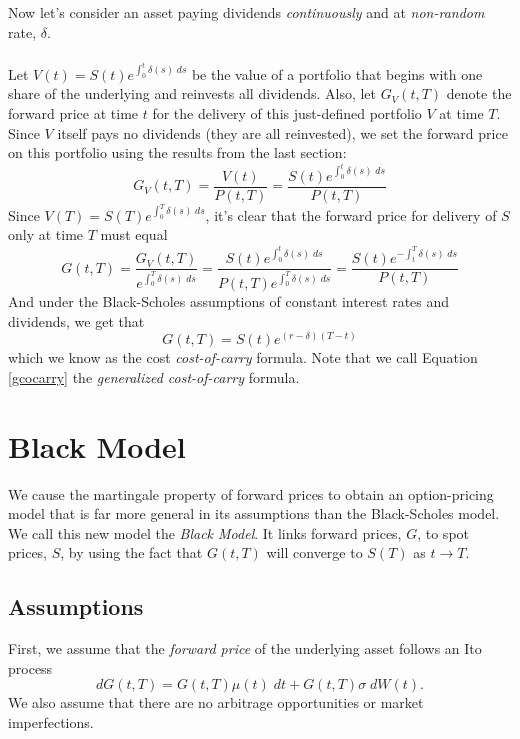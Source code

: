 \documentclass[12pt]{article}
\theoremstyle{plain}
\theoremstyle{definition}
\theoremstyle{remark}
\begin{document}
Now let's consider an asset paying dividends \emph{continuously}
and at \emph{non-random} rate, $\delta$.
\\
\\
Let $V(t) = S(t) e^{\int^t_0 \delta(s) \; ds}$ be the value of a
portfolio that begins with one share of the underlying and
reinvests all dividends.  Also, let $G_V(t,T)$ denote the forward
price at time $t$ for the delivery of this just-defined portfolio
$V$ at time $T$. Since $V$ itself pays no dividends (they are all
reinvested), we set the forward price on this portfolio using the 
results from the last section:
\[ G_V(t,T) = \frac{V(t)}{P(t,T)} = 
   \frac{S(t) e^{\int^t_0 \delta(s)\; ds} }{P(t,T)} \]
Since $V(T) = S(T) e^{\int^T_0 \delta(s)\; ds}$, it's clear that the 
forward price for delivery of $S$ only at time $T$ must equal
\begin{equation}
   \label{gcocarry}
    G(t,T) = \frac{G_V(t,T)}{ e^{\int^T_0 \delta(s)\; ds}} =
      \frac{S(t)e^{\int^t_0 \delta(s)\; ds}}{P(t,T) 
      e^{\int^T_0 \delta(s)\; ds}}
      = \frac{S(t)e^{-\int^T_t \delta(s)\; ds}}{P(t,T)}
\end{equation}
And under the Black-Scholes assumptions of constant interest rates and
dividends, we get that
   \[ G(t,T) = S(t) e^{(r-\delta)(T-t)} \]
which we know as the cost \emph{cost-of-carry} formula.  Note that
we call Equation \ref{gcocarry} the \emph{generalized cost-of-carry}
formula.

\newpage

\section{Black Model}

We cause the martingale property of forward prices to obtain an 
option-pricing model that is far more general in its assumptions than
the Black-Scholes model. We call this new model the \emph{Black 
Model}. It links forward prices, $G$, to spot prices, $S$, by using
the fact that $G(t,T)$ will converge to $S(T)$ as $t\rightarrow T$.

\subsection{Assumptions}

First, we assume that the \emph{forward price} of the underlying
asset follows an Ito process 
\begin{equation}
   \label{blacksde}
    dG(t,T) = G(t,T) \mu(t) \; dt + G(t,T) \sigma \; dW(t).
\end{equation}
We also assume that there are no arbitrage opportunities or market
imperfections. 
\end{document}
